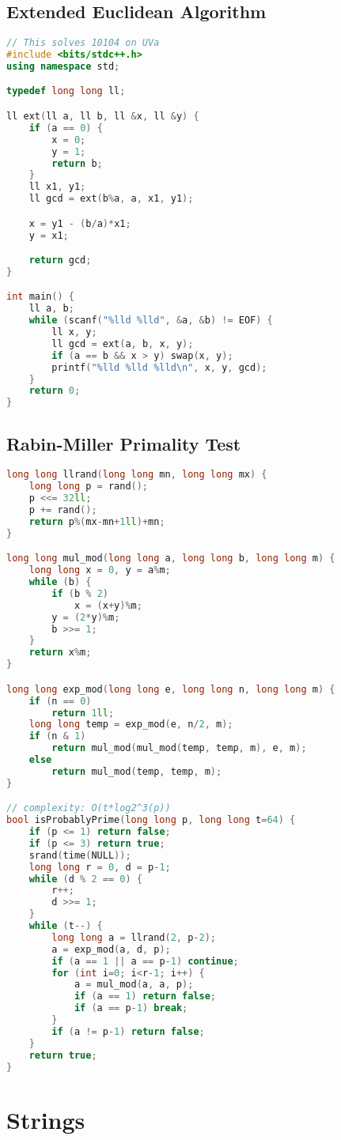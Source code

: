 \documentclass{article}
\begin{document}
\subsection{Extended Euclidean Algorithm}
\begin{lstlisting}[language=C++]
// This solves 10104 on UVa
#include <bits/stdc++.h>
using namespace std;

typedef long long ll;

ll ext(ll a, ll b, ll &x, ll &y) {
	if (a == 0) {
		x = 0;
		y = 1;
		return b;
	}
	ll x1, y1;
	ll gcd = ext(b%a, a, x1, y1);

	x = y1 - (b/a)*x1;
	y = x1;

	return gcd;
}

int main() {
	ll a, b;
	while (scanf("%lld %lld", &a, &b) != EOF) {
		ll x, y;
		ll gcd = ext(a, b, x, y);
		if (a == b && x > y) swap(x, y);
		printf("%lld %lld %lld\n", x, y, gcd);	
	}
    return 0;
}

\end{lstlisting}
\subsection{Rabin-Miller Primality Test}
\begin{lstlisting}[language=C++]
long long llrand(long long mn, long long mx) {
	long long p = rand();
	p <<= 32ll;
	p += rand();
	return p%(mx-mn+1ll)+mn;
}

long long mul_mod(long long a, long long b, long long m) {
	long long x = 0, y = a%m;
	while (b) {
		if (b % 2)
			x = (x+y)%m;
		y = (2*y)%m;
		b >>= 1;
	}
	return x%m;
}

long long exp_mod(long long e, long long n, long long m) {
	if (n == 0)
		return 1ll;
	long long temp = exp_mod(e, n/2, m);
	if (n & 1)
		return mul_mod(mul_mod(temp, temp, m), e, m);
	else
		return mul_mod(temp, temp, m);
}

// complexity: O(t*log2^3(p))
bool isProbablyPrime(long long p, long long t=64) {
	if (p <= 1) return false;
	if (p <= 3) return true;
	srand(time(NULL));
	long long r = 0, d = p-1;
	while (d % 2 == 0) {
		r++;
		d >>= 1;
	}
	while (t--) {
		long long a = llrand(2, p-2);
		a = exp_mod(a, d, p);
		if (a == 1 || a == p-1) continue;
		for (int i=0; i<r-1; i++) {
			a = mul_mod(a, a, p);
			if (a == 1) return false;
			if (a == p-1) break;
		}
		if (a != p-1) return false;
	}
	return true;
}
\end{lstlisting}
\section{Strings}
\end{document}
